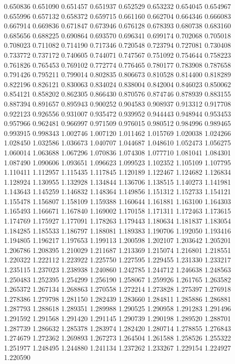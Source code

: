 0.650836
0.651090
0.651457
0.651937
0.652529
0.653232
0.654045
0.654967
0.655996
0.657132
0.658372
0.659715
0.661160
0.662704
0.664346
0.666083
0.667914
0.669836
0.671847
0.673946
0.676128
0.678393
0.680738
0.683160
0.685656
0.688225
0.690864
0.693570
0.696341
0.699174
0.702068
0.705018
0.708023
0.711082
0.714190
0.717346
0.720548
0.723794
0.727081
0.730408
0.733772
0.737172
0.740605
0.744071
0.747567
0.751092
0.754644
0.758223
0.761826
0.765453
0.769102
0.772774
0.776465
0.780177
0.783908
0.787658
0.791426
0.795211
0.799014
0.802835
0.806673
0.810528
0.814400
0.818289
0.822196
0.826121
0.830063
0.834024
0.838004
0.842004
0.846023
0.850062
0.854121
0.858202
0.862305
0.866430
0.870576
0.874746
0.878939
0.883155
0.887394
0.891657
0.895943
0.900252
0.904583
0.908937
0.913312
0.917708
0.922123
0.926556
0.931007
0.935472
0.939952
0.944443
0.948944
0.953453
0.957966
0.962481
0.966997
0.971509
0.976015
0.980512
0.984996
0.989465
0.993915
0.998343
1.002746
1.007120
1.011462
1.015769
1.020038
1.024266
1.028450
1.032586
1.036673
1.040707
1.044687
1.048610
1.052473
1.056275
1.060014
1.063688
1.067296
1.070836
1.074308
1.077710
1.081041
1.084301
1.087490
1.090606
1.093651
1.096623
1.099523
1.102352
1.105109
1.107795
1.110411
1.112957
1.115435
1.117845
1.120189
1.122467
1.124682
1.126834
1.128924
1.130955
1.132928
1.134844
1.136706
1.138515
1.140273
1.141981
1.143643
1.145259
1.146832
1.148364
1.149856
1.151312
1.152733
1.154121
1.155478
1.156807
1.158109
1.159388
1.160644
1.161881
1.163100
1.164303
1.165493
1.166671
1.167840
1.169002
1.170158
1.171311
1.172463
1.173615
1.174769
1.175927
1.177091
1.178263
1.179443
1.180634
1.181837
1.183054
1.184285
1.185533
1.186797
1.188081
1.189383
1.190706
1.192050
1.193416
1.194805
1.196217
1.197653
1.199113
1.200598
1.202107
1.203642
1.205201
1.206786
1.208395
1.210029
1.211687
1.213369
1.215074
1.216801
1.218551
1.220322
1.222112
1.223922
1.225750
1.227595
1.229455
1.231330
1.233217
1.235115
1.237023
1.238938
1.240860
1.242785
1.244712
1.246638
1.248563
1.250483
1.252395
1.254299
1.256190
1.258067
1.259926
1.261765
1.263582
1.265372
1.267134
1.268863
1.270558
1.272214
1.273828
1.275397
1.276918
1.278386
1.279798
1.281150
1.282439
1.283660
1.284811
1.285886
1.286881
1.287793
1.288618
1.289351
1.289988
1.290525
1.290958
1.291283
1.291496
1.291592
1.291568
1.291420
1.291145
1.290739
1.290198
1.289520
1.288701
1.287739
1.286632
1.285378
1.283974
1.282420
1.280714
1.278855
1.276843
1.274679
1.272362
1.269893
1.267273
1.264504
1.261588
1.258526
1.255322
1.251977
1.248495
1.244880
1.241134
1.237262
1.233267
1.229154
1.224927
1.220590
